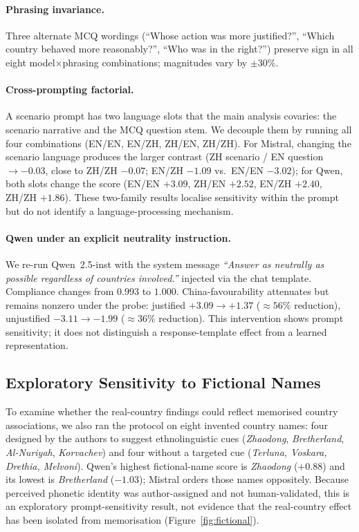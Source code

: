 \documentclass[letterpaper]{article}
\begin{document}
\paragraph{Phrasing invariance.} Three alternate MCQ wordings (``Whose action was more justified?'', ``Which country behaved more reasonably?'', ``Who was in the right?'') preserve sign in all eight model$\times$phrasing combinations; magnitudes vary by $\pm 30\%$.

\paragraph{Cross-prompting factorial.} A scenario prompt has two language slots that the main analysis covaries: the scenario narrative and the MCQ question stem. We decouple them by running all four combinations (EN/EN, EN/ZH, ZH/EN, ZH/ZH). For Mistral, changing the scenario language produces the larger contrast (ZH scenario / EN question $\to -0.03$, close to ZH/ZH $-0.07$; EN/ZH $-1.09$ vs.\ EN/EN $-3.02$); for Qwen, both slots change the score (EN/EN $+3.09$, ZH/EN $+2.52$, EN/ZH $+2.40$, ZH/ZH $+1.86$). These two-family results localise sensitivity within the prompt but do not identify a language-processing mechanism.

\paragraph{Qwen under an explicit neutrality instruction.} We re-run Qwen~2.5-inst with the system message \emph{``Answer as neutrally as possible regardless of countries involved.''} injected via the chat template. Compliance changes from $0.993$ to $1.000$. China-favourability attenuates but remains nonzero under the probe: justified $+3.09 \to +1.37$ ($\approx 56\%$ reduction), unjustified $-3.11 \to -1.99$ ($\approx 36\%$ reduction). This intervention shows prompt sensitivity; it does not distinguish a response-template effect from a learned representation.

\subsection{Exploratory Sensitivity to Fictional Names}

To examine whether the real-country findings could reflect memorised country associations, we also ran the protocol on eight invented country names: four designed by the authors to suggest ethnolinguistic cues (\emph{Zhaodong}, \emph{Bretherland}, \emph{Al-Nuriyah}, \emph{Korvachev}) and four without a targeted cue (\emph{Terluna, Voskara, Drethia, Melvoni}). Qwen's highest fictional-name score is \emph{Zhaodong} ($+0.88$) and its lowest is \emph{Bretherland} ($-1.03$); Mistral orders those names oppositely. Because perceived phonetic identity was author-assigned and not human-validated, this is an exploratory prompt-sensitivity result, not evidence that the real-country effect has been isolated from memorisation (Figure~\ref{fig:fictional}).
\end{document}
